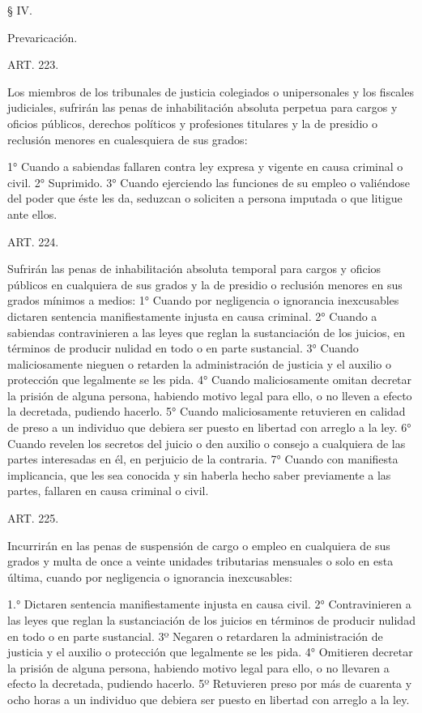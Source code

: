     § IV.

    Prevaricación.



    ART. 223.

    Los miembros de los tribunales de justicia colegiados o unipersonales y los fiscales judiciales, sufrirán las penas de inhabilitación absoluta perpetua para cargos y oficios públicos, derechos políticos y profesiones titulares y la de presidio o reclusión menores en cualesquiera de sus grados:

    1° Cuando a sabiendas fallaren contra ley expresa y vigente en causa criminal o civil.
    2° Suprimido.
    3° Cuando ejerciendo las funciones de su empleo o valiéndose del poder que éste les da, seduzcan o soliciten a persona imputada o que litigue ante ellos.






    ART. 224.

    Sufrirán las penas de inhabilitación absoluta temporal para cargos y oficios públicos en cualquiera de sus grados y la de presidio o reclusión menores en sus grados mínimos a medios:
    1° Cuando por negligencia o ignorancia inexcusables dictaren sentencia manifiestamente injusta en causa criminal.
    2° Cuando a sabiendas contravinieren a las leyes que reglan la sustanciación de los juicios, en términos de producir nulidad en todo o en parte sustancial.
    3° Cuando maliciosamente nieguen o retarden la administración de justicia y el auxilio o protección que legalmente se les pida.
    4° Cuando maliciosamente omitan decretar la prisión de alguna persona, habiendo motivo legal para ello, o no lleven a efecto la decretada, pudiendo hacerlo.
    5° Cuando maliciosamente retuvieren en calidad de preso a un individuo que debiera ser puesto en libertad con arreglo a la ley.
    6° Cuando revelen los secretos del juicio o den auxilio o consejo a cualquiera de las partes interesadas en él, en perjuicio de la contraria.
    7° Cuando con manifiesta implicancia, que les sea conocida y sin haberla hecho saber previamente a las partes, fallaren en causa criminal o civil.

    ART. 225.

    Incurrirán en las penas de suspensión de cargo o empleo en cualquiera de sus grados y multa de once a veinte unidades tributarias mensuales o solo en esta última, cuando por negligencia o ignorancia inexcusables:

    1.° Dictaren sentencia manifiestamente injusta en causa civil.
    2° Contravinieren a las leyes que reglan la sustanciación de los juicios en términos de producir nulidad en todo o en parte sustancial.
    3º Negaren o retardaren la administración de justicia y el auxilio o protección que legalmente se les pida.
    4° Omitieren decretar la prisión de alguna persona, habiendo motivo legal para ello, o no llevaren a efecto la decretada, pudiendo hacerlo.
    5º Retuvieren preso por más de cuarenta y ocho horas a un individuo que debiera ser puesto en libertad con arreglo a la ley.







